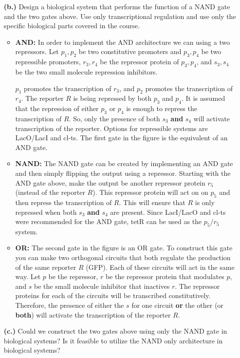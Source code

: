 \documentclass[11pt]{article}
\begin{document}
\begin{itemize}
\item[{\bf (b.)}] Design a biological system that performs the function of a NAND gate and the two gates above. Use only transcriptional regulation and use only the specific biological parts covered in the course.

  \begin{itemize}
\item {\bf AND:}
In order to implement the AND architecture we can using a two repressors. Let $p_1, p_2$ be two constitutive promoters and $p_3,p_4$ be two repressible promoters, $r_3,r_4$ be the repressor protein of $p_3,p_4$, and $s_3,s_4$ be the two small molecule repression inhibitors. 

$p_1$ promotes the transcription of $r_3$, and $p_2$ promotes the transcription of $r_4$. 
The reporter $R$ is being repressed by both $p_3$ and $p_4$. 
It is assumed that the repression of either $p_3$ or $p_4$ is enough to repress the transcription of $R$. 
So, only the presence of both $s_3$ {\bf and} $s_4$ will activate transcription of the reporter. Options for repressible systems are LacO/LacI and cl-ts. 
The first gate in the figure is the equivalent of an AND gate.

\item {\bf NAND:}  The NAND gate can be created by implementing an AND gate and then simply flipping the output using a repressor.
Starting with the AND gate above, make the output be another repressor protein $r_5$ (instead of the reporter $R$). 
This repressor protein will act on on $p_5$ and then repress the transcription of $R$. This will ensure that $R$ is only repressed when both $s_3$ {\bf and} $s_4$ are present.
Since LacI/LacO and cl-ts were recommended for the AND gate, tetR can be used as the $p_5/r_5$ system.

\item {\bf OR:} The second gate in the figure is an OR gate. To construct this gate you can make two orthogonal circuits that both regulate the production of the same reporter $R$ (GFP). Each of these circuits will act in the same way. 
Let $p$ be the repressor, $r$ be the repressor protein that modulates $p$, and $s$ be the small molecule inhibitor that inactives $r$. The repressor proteins for each of the circuits will be transcribed constitutively.
 Therefore, the presence of either the $s$ for one circuit {\bf or} the other (or {\bf both}) will activate the transcription of the reporter $R$.
  \end{itemize}

\item[{\bf (c.)}] Could we construct the two gates above using only the NAND gate in biological systems? Is it feasible to utilize the NAND only architecture in biological systems?


\end{itemize}
\end{document}
